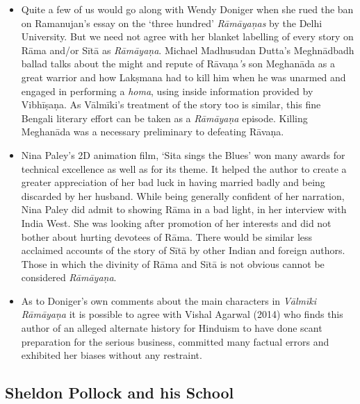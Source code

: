 \begin{itemize}
\item Quite a few of us would go along with Wendy Doniger when she rued the ban on Ramanujan’s essay on the ‘three hundred’ \textit{Rāmāyaņas} by the Delhi University. But we need not agree with her blanket labelling of every story on Rāma and/or Sītā as \textit{Rāmāyaṇa}. Michael Madhusudan Dutta’s Meghnādbadh ballad talks about the might and repute of Rāvaṇa\textit{'s} son Meghanāda as a great warrior and how Lakṣmana had to kill him when he was unarmed and engaged in performing a \textit{homa}, using inside information provided by Vibhīṣaṇa. As Vālmīki’s treatment of the story too is similar, this fine Bengali literary effort can be taken as a \textit{Rāmāyaṇa} episode. Killing Meghanāda was a necessary preliminary to defeating Rāvaṇa.

 \item Nina Paley’s 2D animation film, ‘Sita sings the Blues’ won many awards for technical excellence as well as for its theme. It helped the author to create a greater appreciation of her bad luck in having married badly and being discarded by her husband. While being generally confident of her narration, Nina Paley did admit to showing Rāma in a bad light, in her interview with India West. She was looking after promotion of her interests and did not bother about hurting devotees of Rāma. There would be similar less acclaimed accounts of the story of Sītā by other Indian and foreign authors. Those in which the divinity of Rāma and Sītā is not obvious cannot be considered \textit{Rāmāyaṇa}.

 \item As to Doniger’s own comments about the main characters in \textit{Vālmīki Rāmāyaṇa} it is possible to agree with Vishal Agarwal (2014) who finds this author of an alleged alternate history for Hinduism to have done scant preparation for the serious business, committed many factual errors and exhibited her biases without any restraint.

\end{itemize}


\subsection*{Sheldon Pollock and his School}

